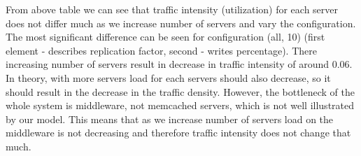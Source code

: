 \documentclass[11pt]{article}
\newcommand{\rowstyle}[1]{\gdef\currentrowstyle{#1}%
  #1\ignorespaces
}
\begin{document}
{\small
\begin{center}
\end{center}
}

From above table we can see that traffic intensity (utilization) for each server does not differ much as we increase number of servers and vary the configuration. The most significant difference can be seen for configuration (all, 10) (first element - describes replication factor, second - writes percentage). There increasing number of servers result in decrease in traffic intensity of around 0.06. In theory, 
with more servers load for each servers should also decrease, so it should result in the decrease in the traffic density. However, the bottleneck of the whole system is middleware, not memcached servers, which is not well illustrated by our model. This means that as we increase number of servers load on the middleware is not decreasing and therefore traffic intensity does not change that much.
\end{document}
